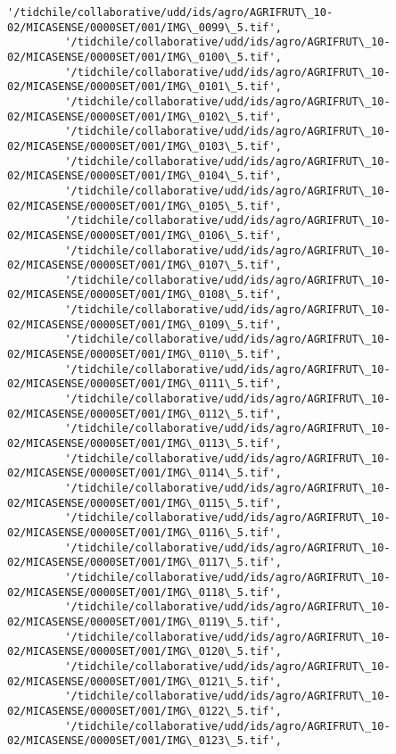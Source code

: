 \documentclass[11pt]{article}
\begin{document}
\begin{Verbatim}[commandchars=\\\{\}]
         '/tidchile/collaborative/udd/ids/agro/AGRIFRUT\_10-02/MICASENSE/0000SET/001/IMG\_0099\_5.tif',
         '/tidchile/collaborative/udd/ids/agro/AGRIFRUT\_10-02/MICASENSE/0000SET/001/IMG\_0100\_5.tif',
         '/tidchile/collaborative/udd/ids/agro/AGRIFRUT\_10-02/MICASENSE/0000SET/001/IMG\_0101\_5.tif',
         '/tidchile/collaborative/udd/ids/agro/AGRIFRUT\_10-02/MICASENSE/0000SET/001/IMG\_0102\_5.tif',
         '/tidchile/collaborative/udd/ids/agro/AGRIFRUT\_10-02/MICASENSE/0000SET/001/IMG\_0103\_5.tif',
         '/tidchile/collaborative/udd/ids/agro/AGRIFRUT\_10-02/MICASENSE/0000SET/001/IMG\_0104\_5.tif',
         '/tidchile/collaborative/udd/ids/agro/AGRIFRUT\_10-02/MICASENSE/0000SET/001/IMG\_0105\_5.tif',
         '/tidchile/collaborative/udd/ids/agro/AGRIFRUT\_10-02/MICASENSE/0000SET/001/IMG\_0106\_5.tif',
         '/tidchile/collaborative/udd/ids/agro/AGRIFRUT\_10-02/MICASENSE/0000SET/001/IMG\_0107\_5.tif',
         '/tidchile/collaborative/udd/ids/agro/AGRIFRUT\_10-02/MICASENSE/0000SET/001/IMG\_0108\_5.tif',
         '/tidchile/collaborative/udd/ids/agro/AGRIFRUT\_10-02/MICASENSE/0000SET/001/IMG\_0109\_5.tif',
         '/tidchile/collaborative/udd/ids/agro/AGRIFRUT\_10-02/MICASENSE/0000SET/001/IMG\_0110\_5.tif',
         '/tidchile/collaborative/udd/ids/agro/AGRIFRUT\_10-02/MICASENSE/0000SET/001/IMG\_0111\_5.tif',
         '/tidchile/collaborative/udd/ids/agro/AGRIFRUT\_10-02/MICASENSE/0000SET/001/IMG\_0112\_5.tif',
         '/tidchile/collaborative/udd/ids/agro/AGRIFRUT\_10-02/MICASENSE/0000SET/001/IMG\_0113\_5.tif',
         '/tidchile/collaborative/udd/ids/agro/AGRIFRUT\_10-02/MICASENSE/0000SET/001/IMG\_0114\_5.tif',
         '/tidchile/collaborative/udd/ids/agro/AGRIFRUT\_10-02/MICASENSE/0000SET/001/IMG\_0115\_5.tif',
         '/tidchile/collaborative/udd/ids/agro/AGRIFRUT\_10-02/MICASENSE/0000SET/001/IMG\_0116\_5.tif',
         '/tidchile/collaborative/udd/ids/agro/AGRIFRUT\_10-02/MICASENSE/0000SET/001/IMG\_0117\_5.tif',
         '/tidchile/collaborative/udd/ids/agro/AGRIFRUT\_10-02/MICASENSE/0000SET/001/IMG\_0118\_5.tif',
         '/tidchile/collaborative/udd/ids/agro/AGRIFRUT\_10-02/MICASENSE/0000SET/001/IMG\_0119\_5.tif',
         '/tidchile/collaborative/udd/ids/agro/AGRIFRUT\_10-02/MICASENSE/0000SET/001/IMG\_0120\_5.tif',
         '/tidchile/collaborative/udd/ids/agro/AGRIFRUT\_10-02/MICASENSE/0000SET/001/IMG\_0121\_5.tif',
         '/tidchile/collaborative/udd/ids/agro/AGRIFRUT\_10-02/MICASENSE/0000SET/001/IMG\_0122\_5.tif',
         '/tidchile/collaborative/udd/ids/agro/AGRIFRUT\_10-02/MICASENSE/0000SET/001/IMG\_0123\_5.tif',

\end{Verbatim}
\end{document}
